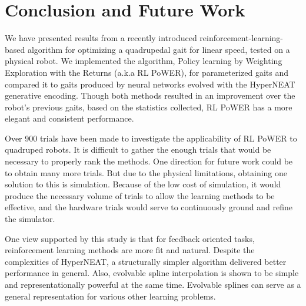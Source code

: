 \section{Conclusion and Future Work}

We have presented results from a recently introduced reinforcement-learning-based algorithm for
optimizing a quadrupedal gait for linear speed, tested on a physical robot.  We implemented the algorithm, Policy learning by Weighting
Exploration with the Returns (a.k.a RL PoWER), for parameterized gaits and compared
it to gaits produced by neural networks evolved with the HyperNEAT
generative encoding. Though both methods resulted in an improvement
over the robot’s previous \naive gaits, based on the statistics
collected, RL PoWER has a more elegant and consistent performance.

Over 900 trials have been made to investigate the applicability
of RL PoWER to quadruped robots. It is difficult to gather the enough
trials that would be necessary to properly rank the methods. One
direction for future work could be to obtain many more trials. But due
to the physical limitations, obtaining one solution to this is
simulation. Because of the low cost of simulation, it would produce
the necessary volume of trials to allow the learning methods to be
effective, and the hardware trials would serve to continuously ground
and refine the simulator. 

One view supported by this study is that for feedback oriented tasks,
reinforcement learning methods are more fit and natural. Despite the
complexities of HyperNEAT, a structurally simpler algorithm delivered better performance in general.  Also, evolvable spline
interpolation is shown to be simple and representationally powerful at
the same time. Evolvable splines can serve as a general representation for various other
learning problems.
